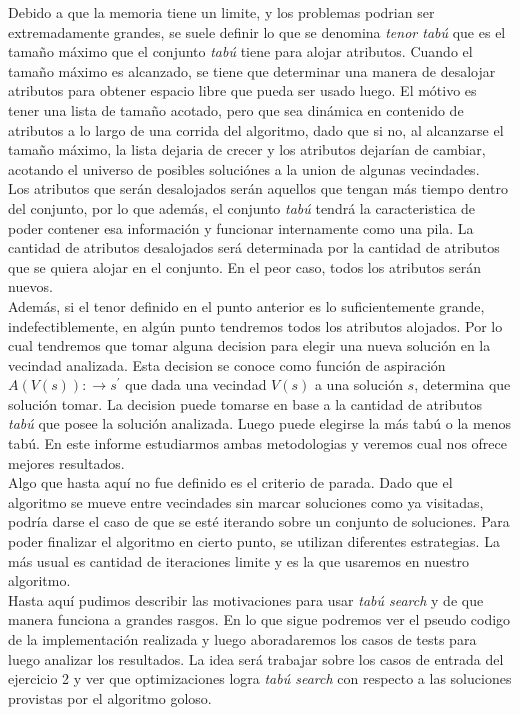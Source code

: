 Debido a que la memoria tiene un limite, y los problemas podrian ser extremadamente grandes, se suele definir lo que se denomina \textit{tenor tabú} que es el tamaño máximo que el conjunto \textit{tabú} tiene para alojar atributos. Cuando el tamaño máximo es alcanzado, se tiene que determinar una manera de desalojar atributos para obtener espacio libre que pueda ser usado luego. El mótivo es tener una lista de tamaño acotado, pero que sea dinámica en contenido de atributos a lo largo de una corrida del algoritmo, dado que si no, al alcanzarse el tamaño máximo, la lista dejaria de crecer y los atributos dejarían de cambiar, acotando el universo de posibles soluciónes a la union de algunas vecindades.\\
Los atributos que serán desalojados serán aquellos que tengan más tiempo dentro del conjunto, por lo que además, el conjunto \textit{tabú} tendrá la caracteristica de poder contener esa información y funcionar internamente como una pila. 
La cantidad de atributos desalojados será determinada por la cantidad de atributos que se quiera alojar en el conjunto. En el peor caso, todos los atributos serán nuevos.\\

Además, si el tenor definido en el punto anterior es lo suficientemente grande, indefectiblemente, en algún punto tendremos todos los atributos alojados. Por lo cual tendremos que tomar alguna decision para elegir una nueva solución en la vecindad analizada. Esta decision se conoce como función de aspiración $A(V(s)): \rightarrow s^{'}$ que dada una vecindad $V(s)$ a una solución $s$, determina que solución tomar.
La decision puede tomarse en base a la cantidad de atributos \textit{tabú} que posee la solución analizada. Luego puede elegirse la más tabú o la menos tabú.
En este informe estudiarmos ambas metodologias y veremos cual nos ofrece mejores resultados.\\

Algo que hasta aquí no fue definido es el criterio de parada. Dado que el algoritmo se mueve entre vecindades sin marcar soluciones como ya visitadas, podría darse el caso de que se esté iterando sobre un conjunto de soluciones. Para poder finalizar el algoritmo en cierto punto, se utilizan diferentes estrategias. La más usual es cantidad de iteraciones limite y es la que usaremos en nuestro algoritmo.\\

Hasta aquí pudimos describir las motivaciones para usar \textit{tabú search} y de que manera funciona a grandes rasgos. En lo que sigue podremos ver el pseudo codigo de la implementación realizada y luego aboradaremos los casos de tests para luego analizar los resultados.  La idea será trabajar sobre los casos de entrada del ejercicio 2 y ver que optimizaciones logra \textit{tabú search} con respecto a las soluciones provistas por el algoritmo goloso.
